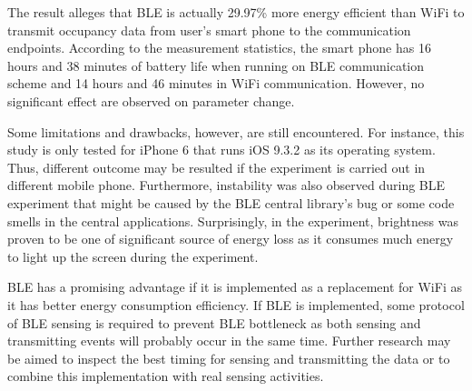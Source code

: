 \documentclass[journal]{vgtc}                %
\begin{document}
The result alleges that BLE is actually 29.97\% more energy efficient than WiFi to transmit occupancy data from user's smart phone to the communication endpoints. According to the measurement statistics, the smart phone has 16 hours and 38 minutes of battery life when running on BLE communication scheme and 14 hours and 46 minutes in WiFi communication. However, no significant effect are observed on parameter change.

Some limitations and drawbacks, however, are still encountered. For instance, this study is only tested for iPhone 6 that runs iOS 9.3.2 as its operating system. Thus, different outcome may be resulted if the experiment is carried out in different mobile phone. Furthermore, instability was also observed during BLE experiment that might be caused by the BLE central library's bug or some code smells in the central applications. Surprisingly, in the experiment, brightness was proven to be one of significant source of energy loss as it consumes much energy to light up the screen during the experiment.

BLE has a promising advantage if it is implemented as a replacement for WiFi as it has better energy consumption efficiency. If BLE is implemented, some protocol of BLE sensing is required to prevent BLE bottleneck as both sensing and transmitting events will probably occur in the same time. Further research may be aimed to inspect the best timing for sensing and transmitting the data or to combine this implementation with real sensing activities.






\end{document}

